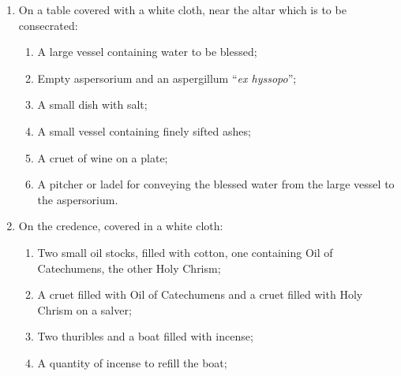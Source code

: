 \documentclass[letterpaper]{report}
\begin{document}
{\begin{enumerate}[label=\Roman*.]
\begin{enumerate}[label=\arabic*.]
                \item In the middle of the church a faldstool and a cushion of
                    a piece of carpet;

                \item A candle-lighter and matches.

            \end{enumerate}

        \item On a table covered with a white cloth, near the altar which is to
            be consecrated:

            \begin{enumerate}[label=\arabic*.]

                \item A large vessel containing water to be blessed;

                \item Empty aspersorium and an aspergillum ``\textit{ex hyssopo}'';

                \item A small dish with salt;

                \item A small vessel containing finely sifted ashes;

                \item A cruet of wine on a plate;

                \item A pitcher or ladel for conveying the blessed water from the large vessel to the aspersorium.

            \end{enumerate}

        \item On the credence, covered in a white cloth:

            \begin{enumerate}[label=\arabic*.]

                \item Two small oil stocks, filled with cotton, one containing Oil of Catechumens, the other Holy Chrism;

                \item A cruet filled with Oil of Catechumens and a cruet filled with Holy Chrism on a salver;

                \item Two thuribles and a boat filled with incense;

                \item A quantity of incense to refill the boat;


\end{enumerate}
\end{enumerate}}
\end{document}
